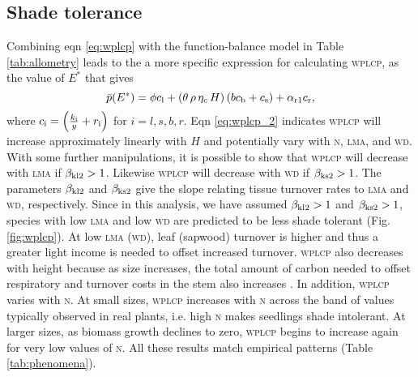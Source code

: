 \documentclass[9pt,twocolumn,twoside,lineno]{pnas-new}
\newcommand{\wplcp}{\textsc{wplcp}}
\newcommand{\lma}{\textsc{lma}}
\newcommand{\wood}{\textsc{wd}}
\newcommand{\nitrogen}{\textsc{n}}
\begin{document}
\subsection{Shade tolerance}
Combining eqn \ref{eq:wplcp} with the function-balance model in Table \ref{tab:allometry} leads to the a more specific expression for calculating {\wplcp}, as the value of $E^*$ that gives
\begin{equation}\label{eq:wplcp_2}
\bar{p}(E^*) =
      \phi c_{\rm l} +
      \left(\theta \, \rho \, \eta_c \, H\right)
        \left(b c_{\rm b}
            + c_{\rm s}\right) +
      \alpha_{\rm r1} c_{\rm r},
\end{equation}
where $c_{\rm i} = \left(\frac{k_{\rm i}}{y} + r_{\rm i}\right)$ for $i=l,s,b,r$.
Eqn \ref{eq:wplcp_2} indicates {\wplcp} will increase approximately linearly with $H$ and potentially vary with {\nitrogen}, {\lma}, and {\wood}. With some further manipulations, it is possible to show that {\wplcp} will decrease with {\lma} if $\beta_{{\rm kl2}} >1$. Likewise {\wplcp} will decrease with {\wood} if $\beta_{{\rm ks2}} >1$. The parameters $\beta_{{\rm kl2}}$ and $\beta_{{\rm ks2}}$ give the slope relating tissue turnover rates to {\lma} and {\wood}, respectively. Since in this analysis, we have assumed $\beta_{{\rm kl2}} >1$ and $\beta_{{\rm ks2}} >1$, species with low {\lma} and low {\wood} are predicted to be less shade tolerant (Fig. \ref{fig:wplcp}). At low {\lma} ({\wood}), leaf (sapwood) turnover is higher and thus a greater light income is needed to offset increased turnover. {\wplcp} also decreases with height because as size increases, the total amount of carbon needed to offset respiratory and turnover costs in the stem also increases \citep{Givnish-1988}. In addition, {\wplcp} varies with {\nitrogen}. At small sizes, {\wplcp} increases with {\nitrogen} across the band of values typically observed in real plants, i.e. high {\nitrogen} makes seedlings shade intolerant. At larger sizes, as biomass growth declines to zero, {\wplcp} begins to increase again for very low values of {\nitrogen}. All these results  match empirical patterns (Table \ref{tab:phenomena}).



\newcommand{\sepp}{{\color{grey}/}}
\newcommand{\upup}{$\uparrow\,\uparrow$}
\newcommand{\updo}{$\uparrow\,\downarrow$}
\newcommand{\dodo}{$\downarrow\,\downarrow$}
\newcommand{\upfl}{$\uparrow$\,--}
\newcommand{\flup}{--$\,\uparrow$}
\newcommand{\dofl}{$\downarrow\,$--}
\newcommand{\doup}{$\downarrow\,\uparrow$}
\newcommand{\fldo}{--$\,\downarrow$}
\end{document}
